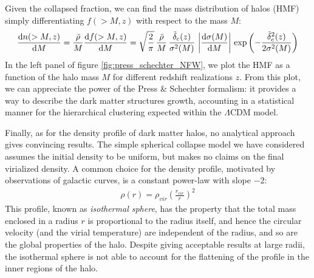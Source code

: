  Given the collapsed fraction, we can find the mass distribution of halos (HMF) simply differentiating $f(>M,z)$ with respect to the mass $M$:
   \begin{align}
\frac{\mathrm{d} n(>M,z)}{\mathrm{d} M} = \frac{\Bar{\rho}}{M} \frac{\mathrm{d} f(>M,z)}{\mathrm{d} M} = \sqrt{\frac{2}{\pi}}\,\frac{\Bar{\rho}}{M}\,\frac{\tilde{\delta}_c(z)}{\sigma^2(M)}\,\left|\frac{\mathrm{d} \sigma(M)}{\mathrm{d} M}\right|\,\exp\left(-\frac{\tilde{\delta}^2_c(z)}{2\sigma^2(M)}\right) \label{eq:press_schechter}
 \end{align}
 In the left panel of figure \ref{fig:press_schechter_NFW}, we plot the HMF as a function of the halo mass $M$ for different redshift realizations $z$. From this plot, we can appreciate the power of the Press \& Schechter formalism: it provides a way to describe the dark matter structures growth, accounting in a statistical manner for the hierarchical clustering expected within the $\Lambda\mathrm{CDM}$ model.
 
 
 Finally, as for the density profile of dark matter halos, no analytical approach gives convincing results. The simple spherical collapse model we have considered assumes the initial density to be uniform, but makes no claims on the final virialized density. A common choice for the density profile, motivated by observations of galactic curves, is a constant power-law with slope $-2$:
   \begin{align}
    \rho(r) = \rho_{vir}\left(\frac{r_{vir}}{r}\right)^2 \label{eq:iso_sphere}
  \end{align}
  This profile, known as \textit{isothermal sphere}, has the property that the total mass enclosed in a radius $r$ is proportional to the radius itself, and hence the circular velocity (and the virial temperature) are independent of the radius, and so are the global properties of the halo. Despite giving acceptable results at large radii, the isothermal sphere is not able to account for the flattening of the profile in the inner regions of the halo.
  
